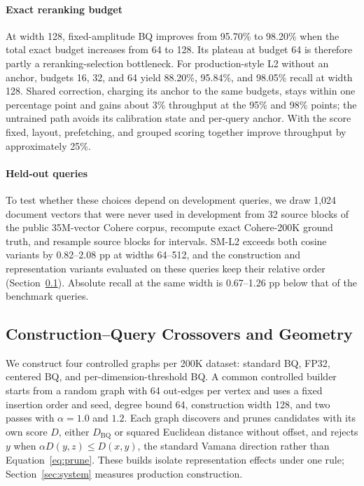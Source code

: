 \paragraph{Exact reranking budget}
At width 128, fixed-amplitude BQ improves from 95.70\% to 98.20\% when the total exact budget increases from 64 to 128. Its plateau at budget 64 is therefore partly a reranking-selection bottleneck. For production-style L2 without an anchor, budgets 16, 32, and 64 yield 88.20\%, 95.84\%, and 98.05\% recall at width 128. Shared correction, charging its anchor to the same budgets, stays within one percentage point and gains about 3\% throughput at the 95\% and 98\% points; the untrained path avoids its calibration state and per-query anchor. With the score fixed, layout, prefetching, and grouped scoring together improve throughput by approximately 25\%.

\paragraph{Held-out queries}
To test whether these choices depend on development queries, we draw 1,024 document vectors that were never used in development from 32 source blocks of the public 35M-vector Cohere corpus, recompute exact Cohere-200K ground truth, and resample source blocks for intervals. SM-L2 exceeds both cosine variants by 0.82--2.08 pp at widths 64--512, and the construction and representation variants evaluated on these queries keep their relative order (Section~\ref{sec:mechanism}). Absolute recall at the same width is 0.67--1.26 pp below that of the benchmark queries.

\subsection{Construction--Query Crossovers and Geometry}
\label{sec:mechanism}
We construct four controlled graphs per 200K dataset: standard BQ, FP32, centered BQ, and per-dimension-threshold BQ. A common controlled builder starts from a random graph with 64 out-edges per vertex and uses a fixed insertion order and seed, degree bound 64, construction width 128, and two passes with $\alpha=1.0$ and $1.2$. Each graph discovers and prunes candidates with its own score $D$, either $D_{\mathrm{BQ}}$ or squared Euclidean distance without offset, and rejects $y$ when $\alpha D(y,z)\le D(x,y)$, the standard Vamana direction rather than Equation~\eqref{eq:prune}. These builds isolate representation effects under one rule; Section~\ref{sec:system} measures production construction.

